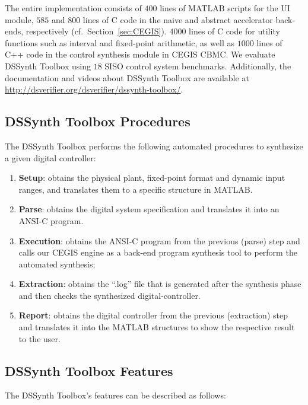 \documentclass[10pt,conference]{IEEEtran}
\newcommand\tool{{DSSynth Toolbox}\xspace}
\begin{document}
The entire implementation consists of $400$ lines of MATLAB scripts for the UI
module, $585$ and $800$ lines of C code in the naive and abstract accelerator
back-ends, respectively (cf.~Section~\ref{sec:CEGIS}).  $4000$ lines of C code for utility functions such as
interval and fixed-point arithmetic, as well as $1000$ lines of C++ code in the
control synthesis module in CEGIS CBMC.  We evaluate \tool using $18$ SISO 
control system benchmarks. Additionally, the documentation and videos about \tool are available 
at \url{http://dsverifier.org/dsverifier/dssynth-toolbox/}.


\subsection{\tool Procedures}

The \tool performs the following automated procedures 
to synthesize a given digital controller:

\begin{enumerate}
\item \textbf{Setup}: obtains the physical plant, fixed-point format 
and dynamic input ranges, and translates them to a specific structure in MATLAB.
\item \textbf{Parse}: obtains the digital system specification and translates 
it into an ANSI-C program.
\item \textbf{Execution}: obtains the ANSI-C program from the previous (parse) step 
and calls our CEGIS engine as a back-end program synthesis tool to perform the automated synthesis;
\item \textbf{Extraction}: obtains the ``.log'' file that is generated 
after the synthesis phase and then checks the synthesized digital-controller.
\item \textbf{Report}: obtains the digital controller from the previous (extraction) step 
and translates it into the MATLAB structures to show the respective result to the user.
\end{enumerate}

\subsection{\tool Features}

The \tool's features can be described as follows:
\end{document}
